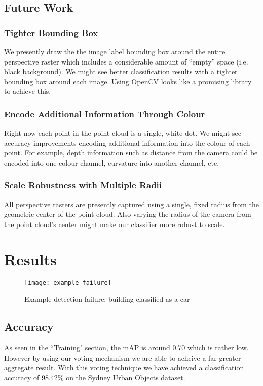 \documentclass[runningheads,a4paper]{llncs}
\begin{document}
\subsection{Future Work}
\subsubsection{Tighter Bounding Box}
We presently draw the the image label bounding box around the entire perspective
raster which includes a considerable amount of “empty” space (i.e. black
background). We might see better classification results with a tighter bounding
box around each image. Using OpenCV looks like a promising library to achieve
this.

\subsubsection{Encode Additional Information Through Colour}
Right now each point in the point cloud is a single, white dot. We might see
accuracy improvements encoding additional information into the colour of each
point. For example, depth information such as distance from the camera could be
encoded into one colour channel, curvature into another channel, etc.

\subsubsection{Scale Robustness with Multiple Radii}
All perspective rasters are presently captured using a single, fixed radius
from the geometric center of the point cloud. Also varying the radius of the
camera from the point cloud’s center might make our classifier more robust to
scale. 

\section{Results}

\begin{figure}[h]
  \caption{Example detection failure: building classified as a car}
  \centering
  \texttt{[image: example-failure]}
  \label{fig:example-failure}
\end{figure}

\subsection{Accuracy}
As seen in the ``Training" section, the mAP is around 0.70 which is rather low. 
However by using our voting mechanism we are able to acheive a far greater aggregate
result. With this voting technique we have achieved a classification accuracy of 98.42\% on 
the Sydney Urban Objects dataset.
\end{document}
